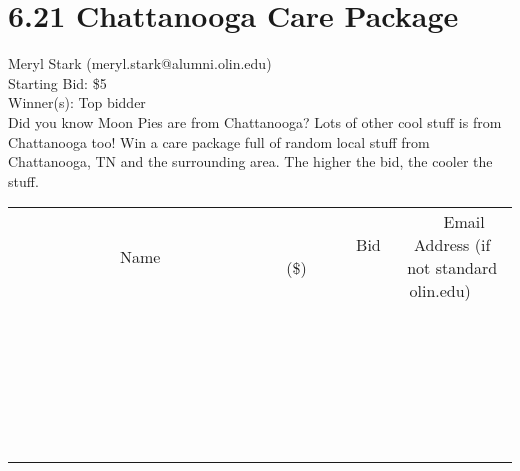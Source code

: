 \documentclass[11pt]{article}
\begin{document}
\section*{6.21 Chattanooga Care Package}
Meryl Stark (meryl.stark@alumni.olin.edu) \\
Starting Bid: \$5 \\
Winner(s): 
Top bidder \\
Did you know Moon Pies are from Chattanooga? Lots of other cool stuff is from Chattanooga too! Win a care package full of random local stuff from Chattanooga, TN and the surrounding area. The higher the bid, the cooler the stuff. \\[6ex]
\begin{tabular}{c c c}
~~~~~~~~~~~~~Name~~~~~~~~~~~~~ & ~~~~~~~~~Bid (\$)~~~~~~~~~ & ~~~Email Address (if not standard olin.edu)~~~ \\
 & & \\
\hline
 & & \\
\hline
 & & \\
\hline
 & & \\
\hline
 & & \\
\hline
 & & \\
\hline
 & & \\
\hline
 & & \\
\hline
 & & \\
\hline
 & & \\
\hline
 & & \\
\hline
 & & \\
\hline
 & & \\
\hline
 & & \\
\hline
 & & \\
\hline
 & & \\
\hline
 & & \\
\hline
 & & \\
\hline
 & & \\
\hline
 & & \\
\hline
 & & \\
\hline
 & & \\
\hline
 & & \\
\hline
 & & \\
\hline
 & & \\
\hline
 & & \\
\hline
\end{tabular}
\clearpage
\end{document}
